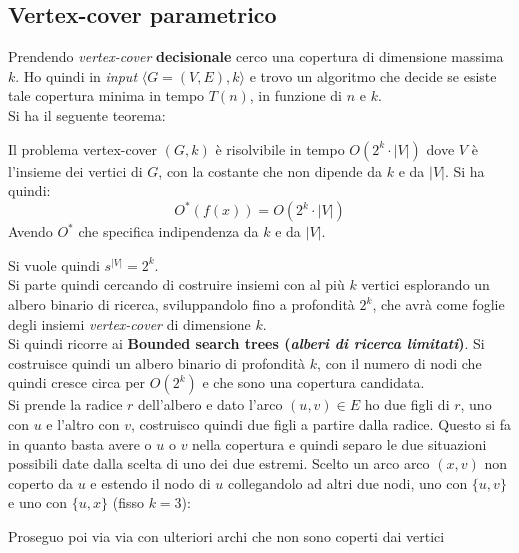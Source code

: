 \subsection{Vertex-cover parametrico}
Prendendo \textit{vertex-cover} \textbf{decisionale} cerco una copertura di
dimensione massima $k$. Ho quindi in \textit{input} $\langle G=(V,E),k\rangle$ e trovo un
algoritmo che decide se esiste tale copertura minima in tempo $T(n)$, in
funzione di $n$ e $k$.\\
Si ha il seguente teorema:
\begin{teorema}
  Il problema vertex-cover $(G,k)$ è risolvibile in tempo $O(2^k\cdot |V|)$ dove
  $V$ è l'insieme dei vertici di $G$, con la costante che non dipende da $k$ e
  da $|V|$. Si ha quindi:
  \[O^*(f(x))=O(2^k\cdot |V|)\]
  Avendo $O^*$ che specifica indipendenza da $k$ e da $|V|$.
\end{teorema}
Si vuole quindi $s^{|V|}=2^k$.\\
Si parte quindi cercando di costruire insiemi con al più $k$ vertici esplorando
un albero binario di ricerca, sviluppandolo fino a profondità $2^k$, che avrà
come foglie degli insiemi \textit{vertex-cover} di dimensione $k$.\\
Si quindi ricorre ai \textbf{Bounded search trees (\textit{alberi di ricerca
    limitati})}. Si costruisce quindi un albero binario di profondità $k$, con
il numero di nodi che quindi cresce circa per $O(2^k)$ e che sono una copertura
candidata. \\
Si prende la radice $r$ dell'albero e dato l'arco $(u,v)\in E$ ho due figli di
$r$, uno con $u$ e l’altro con $v$, costruisco quindi due figli a partire dalla
radice. Questo si fa in quanto basta avere o $u$ o $v$ nella copertura e quindi
separo le due situazioni possibili date dalla scelta di uno dei due
estremi. Scelto un arco arco $(x,v)$ non coperto da $u$ e estendo il nodo di $u$
collegandolo ad altri due nodi, uno con $\{u, v\}$ e uno con $\{u, x\}$ (fisso
$k=3$): 
\begin{center}
\end{center}
Proseguo poi via via con ulteriori archi che non sono coperti dai vertici
